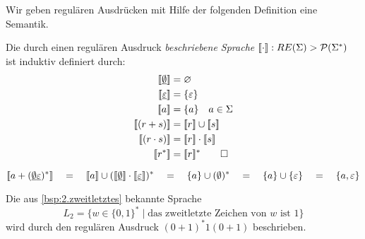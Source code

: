 {\medskip

Wir geben regulären Ausdrücken mit Hilfe der folgenden Definition eine Semantik.
\begin{Def}[name={[Semantik eines regulären Ausdrucks]}]
        Die durch einen regulären Ausdruck \emph{beschriebene Sprache} $\llbracket\cdot \rrbracket : RE(\Sigma) \-> \mathcal{P}(\Sigma^*)$ ist induktiv definiert durch:
        \begin{align*}
                \llbracket \0 \rrbracket &= \varnothing\\
                \llbracket \1 \rrbracket &= \{\Eps\}\\
                \llbracket a \rrbracket &= \{a\} \quad a\in\Sigma\\
                \llbracket (r+s) \rrbracket &= \llbracket r\rrbracket \cup \llbracket s\rrbracket\\
                \llbracket (r\cdot s) \rrbracket &= \llbracket r\rrbracket \cdot \llbracket s\rrbracket\\
                \llbracket r^* \rrbracket &= \llbracket r\rrbracket^*
                \qedhere
        \end{align*}
\end{Def}
\begin{Bsp}
$$
\llbracket a + (\0\1)^*\rrbracket
\quad=\quad \llbracket a\rrbracket \cup (\llbracket \0\rrbracket \cdot \llbracket \1\rrbracket)^*
\quad=\quad \{ a\} \cup (\emptyset)^*
\quad=\quad \{ a\} \cup \{\varepsilon\}
\quad=\quad \{ a, \varepsilon\}
$$
\end{Bsp}
\begin{Bsp}
Die aus \autoref{bsp:2.zweitletztes} bekannte Sprache 
$$L_2=\{w\in\{0,1\}^*\mid \text{das zweitletzte Zeichen von $w$ ist $1$}\}$$
wird durch den regulären Ausdruck $(0+1)^*1(0+1)$ beschrieben.
\end{Bsp}


}

